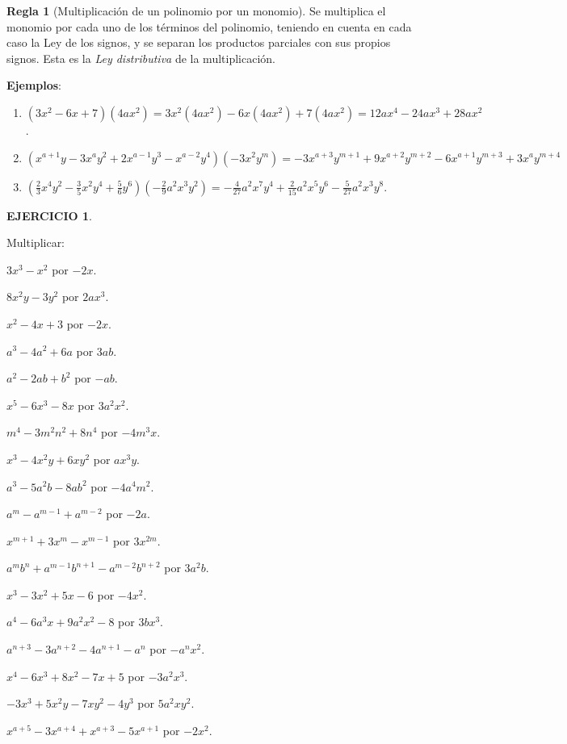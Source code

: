 \documentclass[12pt,letterpaper]{article}
\theoremstyle{definition}
\newtheorem{reg}{Regla}
\newtheorem{ejer}{EJERCICIO}
\begin{document}
\begin{reg}[Multiplicación de un polinomio por un monomio] %
Se multiplica el monomio por cada uno de los términos del polinomio, teniendo en cuenta en cada caso la Ley de los signos, y se separan los productos parciales con sus propios signos. Esta es la \emph{Ley distributiva} de la multiplicación.
\end{reg}

\textbf{Ejemplos}:
\begin{enumerate}
\item $(3x^2-6x+7)(4ax^2)=3x^2(4ax^2)-6x(4ax^2)+7(4ax^2)=12ax^4-24ax^3+28ax^2$.
\item $(x^{a+1}y-3x^ay^2+2x^{a-1}y^3-x^{a-2}y^4)(-3x^2y^m)=-3x^{a+3}y^{m+1}+9x^{a+2}y^{m+2}-6x^{a+1}y^{m+3}+3x^ay^{m+4}$
\item $(\frac{2}{3}x^4y^2-\frac{3}{5}x^2y^4+\frac{5}{6}y^6)(-\frac{2}{9}a^2x^3y^2)=-\frac{4}{27}a^2x^7y^4+\frac{2}{15}a^2x^5y^6-\frac{5}{27}a^2x^3y^8 $.
\end{enumerate}

\pagebreak

\begin{ejer}\

Multiplicar: %
\begin{enumerate}
\begin{multicols}{2}
\item $3x^3-x^2$ por $-2x$.
\item $8x^2y-3y^2$ por $2ax^3$.
\item $x^2-4x+3$ por $-2x$.
\item $a^3-4a^2+6a$ por $3ab$.
\item $a^2-2ab+b^2$ por $-ab$.
\item $x^5-6x^3-8x$ por $3a^2x^2$.
\item $m^4-3m^2n^2+8n^4$ por $-4m^3x$.
\item $x^3-4x^2y+6xy^2$ por $ax^3y$.
\item $a^3-5a^2b-8ab^2$ por $-4a^4m^2$.
\item $a^m-a^{m-1}+a^{m-2}$ por $-2a$.
\item $x^{m+1}+3x^m-x^{m-1}$ por $3x^{2m}$.
\item $a^mb^n+a^{m-1}b^{n+1}-a^{m-2}b^{n+2}$ por $3a^2b$.
\item $x^3-3x^2+5x-6$ por $-4x^2$.
\item $a^4-6a^3x+9a^2x^2-8$ por $3bx^3$.
\item $a^{n+3}-3a^{n+2}-4a^{n+1}-a^n$ por $-a^nx^2$.
\item $x^4-6x^3+8x^2-7x+5$ por $-3a^2x^3$.
\item $-3x^3+5x^2y-7xy^2-4y^3 $ por $5a^2xy^2$.
\item $x^{a+5}-3x^{a+4}+x^{a+3}-5x^{a+1}$ por $-2x^2$. %
\end{multicols}
\end{enumerate}
\end{ejer}
\end{document}

